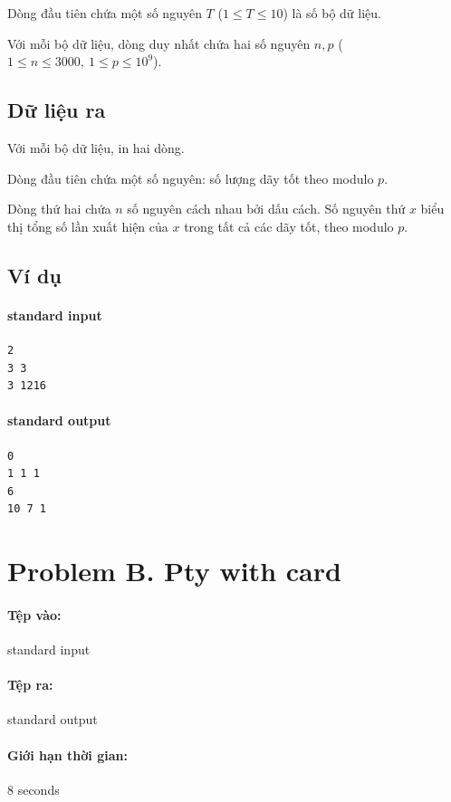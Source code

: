 \documentclass[11pt]{article}
\begin{document}
Dòng đầu tiên chứa một số nguyên \(T\) (\(1\le T\le 10\)) là số bộ dữ liệu.

Với mỗi bộ dữ liệu, dòng duy nhất chứa hai số nguyên \(n,p\)
(\(1\le n\le 3000,\ 1\le p\le 10^9\)).

\subsection*{Dữ liệu ra}

Với mỗi bộ dữ liệu, in hai dòng.

Dòng đầu tiên chứa một số nguyên: số lượng dãy tốt theo modulo \(p\).

Dòng thứ hai chứa \(n\) số nguyên cách nhau bởi dấu cách. Số nguyên thứ \(x\)
biểu thị tổng số lần xuất hiện của \(x\) trong tất cả các dãy tốt, theo
modulo \(p\).

\subsection*{Ví dụ}

\paragraph{standard input}
\begin{verbatim}
2
3 3
3 1216
\end{verbatim}

\paragraph{standard output}
\begin{verbatim}
0
1 1 1
6
10 7 1
\end{verbatim}

\section{Problem B. Pty with card}

\paragraph{Tệp vào:} standard input
\paragraph{Tệp ra:} standard output
\paragraph{Giới hạn thời gian:} 8 seconds
\end{document}
